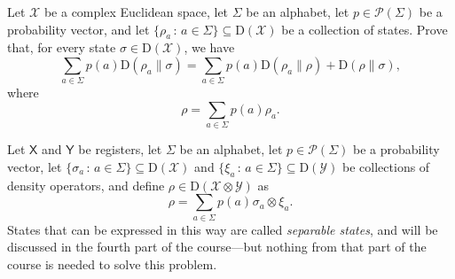 \documentclass[boxes,pages,color=SeaGreen]{homework}
\newcommand{\tinyspace}{\mspace{1mu}}
\renewcommand{\op}[1]{\operatorname{#1}}
\newcommand{\X}{\mathcal{X}}
\newcommand{\Y}{\mathcal{Y}}
\renewcommand{\P}{\mathcal{P}}
\newcommand{\reg}[1]{\mathsf{#1}}
\newcommand{\Density}{\mathrm{D}}
\begin{document}

\begin{problem}
Let $\X$ be a complex Euclidean space,
let $\Sigma$ be an alphabet,
let $p\in\P(\Sigma)$ be a probability vector, and
let $\{\rho_a\,:\,a\in\Sigma\}\subseteq\Density(\X)$ be a collection of
states.
Prove that, for every state $\sigma\in\Density(\X)$, we have
\[
    \sum_{a\in\Sigma} p(a) \mathrm{D}(\rho_a \| \sigma)
    = \sum_{a\in\Sigma} p(a) \mathrm{D}(\rho_a \| \rho) +
    \mathrm{D}(\rho \| \sigma),
\]
where
\[
    \rho = \sum_{a\in\Sigma} p(a) \rho_a.
\]
\end{problem}

\begin{solution}

\end{solution}


\begin{problem}
Let $\reg{X}$ and $\reg{Y}$ be registers, let $\Sigma$ be an alphabet,
let $p\in\P(\Sigma)$ be a probability vector, let
$\{\sigma_a\,:\,a\in\Sigma\}\subseteq\Density(\X)$ and
$\{\xi_a\,:\,a\in\Sigma\}\subseteq\Density(\Y)$ be collections of density
operators, and define $\rho\in\Density(\X\otimes\Y)$ as
\begin{displaymath}
    \rho = \sum_{a\in\Sigma} p(a)\tinyspace\sigma_a\otimes\xi_a.
\end{displaymath}
States that can be expressed in this way are called \emph{separable states},
and will be discussed in the fourth part of the course---but nothing from
that part of the course is needed to solve this problem.

\end{problem}
\end{document}
